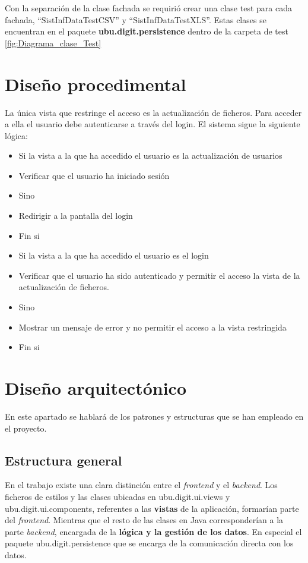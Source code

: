 Con la separación de la clase fachada se requirió crear una clase test para cada fachada, ``SistInfDataTestCSV'' y ``SistInfDataTestXLS''. Estas clases se encuentran en el paquete \textbf{ubu.digit.persistence} dentro de la carpeta de test \ref{fig:Diagrama_clase_Test}


\section{Diseño procedimental}
La única vista que restringe el acceso es la actualización de ficheros. Para acceder a ella el usuario debe autenticarse a través del login. El sistema sigue la siguiente lógica:	
\begin{itemize}
	\item Si la vista a la que ha accedido el usuario es la actualización de usuarios
	\item Verificar que el usuario ha iniciado sesión 
	\item Sino 
	\item Redirigir a la pantalla del login
	\item Fin si
	
	\item Si la vista a la que ha accedido el usuario es el login
	\item Verificar que el usuario ha sido autenticado y permitir el acceso la vista de la actualización de ficheros.
	\item Sino 
	\item Mostrar un mensaje de error y no permitir el acceso a la vista restringida
	\item Fin si	
\end{itemize}

\section{Diseño arquitectónico}
En este apartado se hablará de los patrones y estructuras que se han empleado en el proyecto.

\subsection{Estructura general}
En el trabajo existe una clara distinción entre el \emph{frontend} y el \emph{backend}. 
Los ficheros de estilos y las clases ubicadas en ubu.digit.ui.views y ubu.digit.ui.components, referentes a las \textbf{vistas} de la aplicación, formarían parte del \emph{frontend}. 
Mientras que el resto de las clases en Java corresponderían a la parte \emph{backend}, encargada de la \textbf{lógica y la gestión de los datos}. En especial el paquete ubu.digit.persistence que se encarga de la comunicación directa con los datos. 

